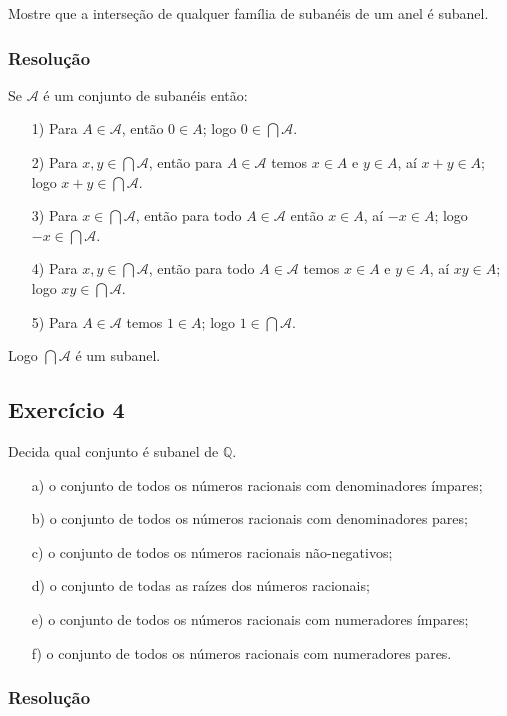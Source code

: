 \documentclass[10pt,a4paper]{article}
\begin{document}
Mostre que a interseção de qualquer família de subanéis de um anel é subanel.

\subsubsection*{Resolução}

Se $\mathcal{A}$ é um conjunto de subanéis então:

\begin{itemize}
\item[1)] Para $A\in\mathcal{A}$, então $0\in A$; logo $0\in\bigcap\mathcal{A}$.
\item[2)] Para $x,y\in\bigcap\mathcal{A}$, então para $A\in\mathcal{A}$ temos $x\in A$ e $y\in A$, aí $x+y\in A$; logo $x+y\in\bigcap\mathcal{A}$.
\item[3)] Para $x\in\bigcap\mathcal{A}$, então para todo $A\in\mathcal{A}$ então $x\in A$, aí $-x\in A$; logo $-x\in\bigcap\mathcal{A}$.
\item[4)] Para $x,y\in\bigcap\mathcal{A}$, então para todo $A\in\mathcal{A}$ temos $x\in A$ e $y\in A$, aí $xy\in A$; logo $xy\in\bigcap\mathcal{A}$.
\item[5)] Para $A\in\mathcal{A}$ temos $1\in A$; logo $1\in\bigcap\mathcal{A}$.
\end{itemize}
Logo $\bigcap\mathcal{A}$ é um subanel.

\subsection*{Exercício 4}

Decida qual conjunto é subanel de $\mathbb{Q}$.

\begin{itemize}
\item[a)] o conjunto de todos os números racionais com denominadores ímpares;
\item[b)] o conjunto de todos os números racionais com denominadores pares;
\item[c)] o conjunto de todos os números racionais não-negativos;
\item[d)] o conjunto de todas as raízes dos números racionais;
\item[e)] o conjunto de todos os números racionais com numeradores ímpares;
\item[f)] o conjunto de todos os números racionais com numeradores pares.
\end{itemize}

\subsubsection*{Resolução}
\end{document}
